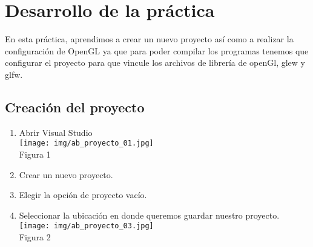 \documentclass[12pt, a4paper]{article}
\begin{document}
\section{Desarrollo de la práctica}
\justify
En esta práctica, aprendimos a crear un nuevo proyecto así como a realizar la configuración de OpenGL ya que para poder compilar los programas tenemos que configurar el proyecto para que vincule los archivos de librería de openGl, glew y glfw.

\subsection{Creación del proyecto}

\begin{enumerate}
	\item Abrir Visual Studio \\[.5 cm]
	\centering 
	\texttt{[image: img/ab\_proyecto\_01.jpg]}\\[.35cm] %
	Figura 1 \\[.5cm]
	\raggedright 
	\item Crear un nuevo proyecto.
	\item Elegir la opción de proyecto vacío.
	
	\raggedright 
	\item Seleccionar la ubicación en donde queremos guardar nuestro proyecto.\\[.1 cm]
	\centering 
	\texttt{[image: img/ab\_proyecto\_03.jpg]}\\[.25cm] %
	Figura 2 \\[.35cm]
	
\end{enumerate}
\end{document}
